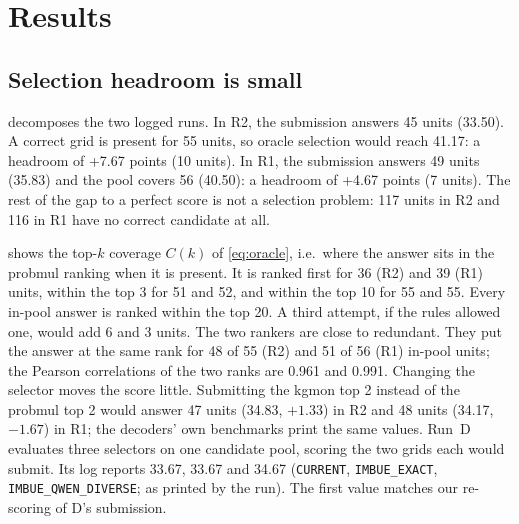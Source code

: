 \documentclass[11pt]{article}
\newcommand{\code}[1]{\texttt{#1}}
\newcommand{\R}[1]{R#1}
\begin{document}
\section{Results}

\subsection{Selection headroom is small}
\label{sec:selection}

 decomposes the two logged runs.
In \R{2}, the submission answers 45 units (33.50). A correct grid is present for 55 units, so oracle selection would reach 41.17: a headroom of +7.67 points (10 units).
In \R{1}, the submission answers 49 units (35.83) and the pool covers 56 (40.50): a headroom of +4.67 points (7 units).
The rest of the gap to a perfect score is not a selection problem: 117 units in \R{2} and 116 in \R{1} have no correct candidate at all.

 shows the top-$k$ coverage $C(k)$ of \cref{eq:oracle}, i.e.\ where the answer sits in the probmul ranking when it is present.
It is ranked first for 36 (\R{2}) and 39 (\R{1}) units, within the top 3 for 51 and 52, and within the top 10 for 55 and 55. Every in-pool answer is ranked within the top 20.
A third attempt, if the rules allowed one, would add 6 and 3 units.
The two rankers are close to redundant. They put the answer at the same rank for 48 of 55 (\R{2}) and 51 of 56 (\R{1}) in-pool units; the Pearson correlations of the two ranks are 0.961 and 0.991.
Changing the selector moves the score little. Submitting the kgmon top 2 instead of the probmul top 2 would answer 47 units (34.83, $+1.33$) in \R{2} and 48 units (34.17, $-1.67$) in \R{1}; the decoders' own benchmarks print the same values.
Run~D evaluates three selectors on one candidate pool, scoring the two grids each would submit. Its log reports 33.67, 33.67 and 34.67 (\code{CURRENT}, \code{IMBUE\_EXACT}, \code{IMBUE\_QWEN\_DIVERSE}; as printed by the run). The first value matches our re-scoring of D's submission.
\end{document}
